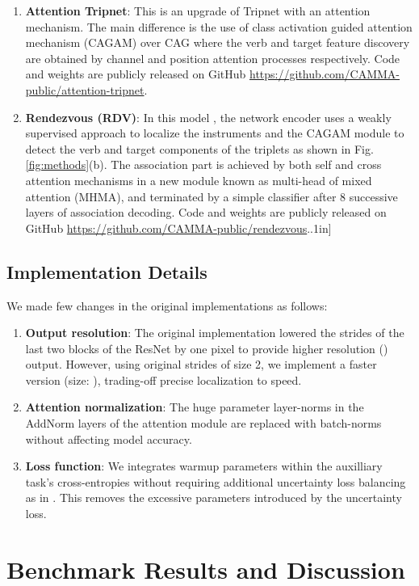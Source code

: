 \documentclass{article}
\begin{document}
{\begin{enumerate}
    \item {\bf Attention Tripnet}: This is an upgrade of Tripnet with an attention mechanism. The main difference is the use of class activation guided attention mechanism (CAGAM) \cite{nwoye2021rendezvous} over CAG where the verb and target feature discovery are obtained by channel and position attention processes respectively. Code and weights are publicly released on GitHub \url{https://github.com/CAMMA-public/attention-tripnet}.
    
    \item {\bf Rendezvous (RDV)}: In this model \cite{nwoye2021rendezvous}, the network encoder uses a weakly supervised approach to localize the instruments and the CAGAM module to detect the verb and target components of the triplets as shown in Fig. \ref{fig:methods}(b). The association part is achieved by both self and cross attention mechanisms in a new module known as multi-head of mixed attention (MHMA), and terminated by a simple classifier after 8 successive layers of association decoding. Code and weights are publicly released on GitHub \url{https://github.com/CAMMA-public/rendezvous}.\0.1in]
\end{enumerate}



\subsection{Implementation Details}
We made few changes in the original implementations \cite{nwoye2020recognition,nwoye2021rendezvous} as follows:
\begin{enumerate}
    \item {\bf Output resolution}: The original implementation lowered the strides of the last two blocks of the ResNet by one pixel to provide higher resolution () output. However, using original strides of size 2, we implement a faster version (size: ), trading-off precise localization to speed.
    \item {\bf Attention normalization}: The huge parameter layer-norms in the AddNorm layers of the attention module are replaced with batch-norms without affecting model accuracy.
    \item {\bf Loss function}: We integrates warmup parameters within the auxilliary task's cross-entropies without requiring additional uncertainty loss balancing \cite{kendall2018multi} as in \cite{nwoye2021rendezvous}. This removes the excessive parameters introduced by the uncertainty loss.
\end{enumerate} \section{Benchmark Results and Discussion}




}
\end{document}
